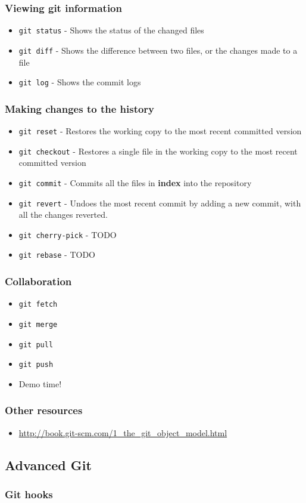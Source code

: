\documentclass{beamer}
\begin{document}
\begin{frame}
  \frametitle{Viewing git information}
  \begin{itemize}
    \item {\tt git status} - Shows the status of the changed files
    \item {\tt git diff} - Shows the difference between two files, or the changes made to a file
    \item {\tt git log} - Shows the commit logs
  \end{itemize}
\end{frame}

\begin{frame}
  \frametitle{Making changes to the history}
  \begin{itemize}
    \item {\tt git reset} - Restores the working copy to the most recent committed version
    \item {\tt git checkout} - Restores a single file in the working copy to the most recent committed version
    \item {\tt git commit} - Commits all the files in {\bf index} into the repository 
    \item {\tt git revert} - Undoes the most recent commit by adding a new commit, with all the changes reverted.
    \item {\tt git cherry-pick} - TODO
    \item {\tt git rebase} - TODO
  \end{itemize}
\end{frame}

\begin{frame}
  \frametitle{Collaboration}
  \begin{itemize}
    \item {\tt git fetch}
    \item {\tt git merge}
    \item {\tt git pull}
    \item {\tt git push}
  \end{itemize}
\end{frame}

\begin{frame}
  \begin{itemize}
    \item Demo time!
  \end{itemize}
\end{frame}

\begin{frame}
  \frametitle{Other resources}
  \begin{itemize}
    \item \url{http://book.git-scm.com/1\_the\_git\_object\_model.html}
  \end{itemize}
\end{frame}

\subsection{Advanced Git}

\begin{frame}
  \frametitle{Git hooks}
\end{frame}
\end{document}
